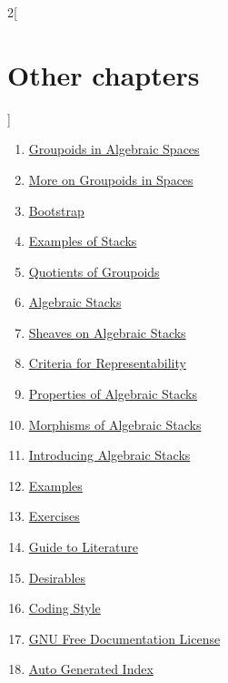 \begin{multicols}{2}[\section{Other chapters}]
\begin{enumerate}
\item \hyperref[spaces-groupoids-section-phantom]{Groupoids in Algebraic Spaces}
\item \hyperref[spaces-more-groupoids-section-phantom]{More on Groupoids in Spaces}
\item \hyperref[bootstrap-section-phantom]{Bootstrap}
\item \hyperref[examples-stacks-section-phantom]{Examples of Stacks}
\item \hyperref[groupoids-quotients-section-phantom]{Quotients of Groupoids}
\item \hyperref[algebraic-section-phantom]{Algebraic Stacks}
\item \hyperref[stacks-sheaves-section-phantom]{Sheaves on Algebraic Stacks}
\item \hyperref[criteria-section-phantom]{Criteria for Representability}
\item \hyperref[stacks-properties-section-phantom]{Properties of Algebraic Stacks}
\item \hyperref[stacks-morphisms-section-phantom]{Morphisms of Algebraic Stacks}
\item \hyperref[stacks-introduction-section-phantom]{Introducing Algebraic Stacks}
\item \hyperref[examples-section-phantom]{Examples}
\item \hyperref[exercises-section-phantom]{Exercises}
\item \hyperref[guide-section-phantom]{Guide to Literature}
\item \hyperref[desirables-section-phantom]{Desirables}
\item \hyperref[coding-section-phantom]{Coding Style}
\item \hyperref[fdl-section-phantom]{GNU Free Documentation License}
\item \hyperref[index-section-phantom]{Auto Generated Index}
\end{enumerate}
\end{multicols}
